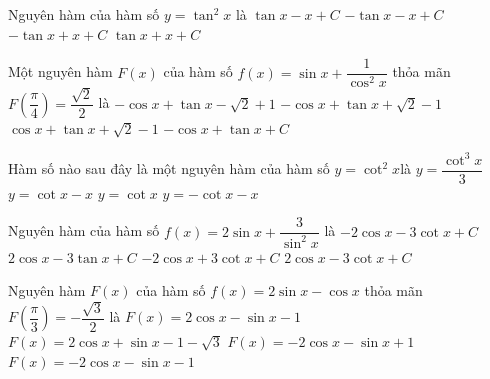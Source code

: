 \begin{ex}%
	Nguyên  hàm của hàm số $y=\tan^2 x$ là
	 \choice
		{\True $\tan  x-x+C$}
		{$-\tan  x-x+C$}
		{$-\tan x+x+C$} 
		{$\tan x+x+C$} 
\end{ex}

\begin{ex}%
	Một nguyên hàm $F(x)$ của hàm số $f(x)=\sin x+\dfrac{1}{\cos^2 x}$ thỏa mãn $F\left(\dfrac{\pi}{4}\right)=\dfrac{\sqrt{2}}{2}$  là
	\choice 
		{$-\cos x+\tan x-\sqrt{2}+1$} 
		{\True  $-\cos x+\tan x+\sqrt{2}-1$}
		{$\cos x+\tan  x+\sqrt{2}-1$}
		 {$-\cos x+\tan x+C$}
\end{ex}

\begin{ex}%
	 Hàm số nào sau đây là một nguyên hàm của hàm số $ y=\cot ^2x$là
	\choice 
		 {$y=\dfrac{\cot^3x}{3}$}
		{$y=\cot x-x$} 
		 {$y=\cot x$}
		{\True  $y=-\cot x-x$}
\end{ex}

\begin{ex}%
	Nguyên hàm của hàm số $f(x)=2\sin x+\dfrac{3}{\sin^2x}$ là 
	\choice 
		{\True  $-2\cos x-3\cot x+C$}
		{$2\cos  x-3\tan x+C$}
		{$-2\cos x+3\cot x+C$} 
		{$2\cos  x-3\cot x+C$}
\end{ex}

\begin{ex}%
	Nguyên hàm $F(x)$ của hàm số  $f(x)=2\sin x-\cos x$ thỏa mãn $F\left(\dfrac{\pi}{3}\right)=-\dfrac{\sqrt{3}}{2}$ là
	 \choice
		{$F(x)=2\cos  x-\sin x-1$}
		{$F(x)=2\cos  x+\sin x-1-\sqrt{3}$}
		{\True $F(x)=-2\cos x-\sin  x+1$}
		 {$F(x)=-2\cos x-\sin x-1$}
\end{ex}

